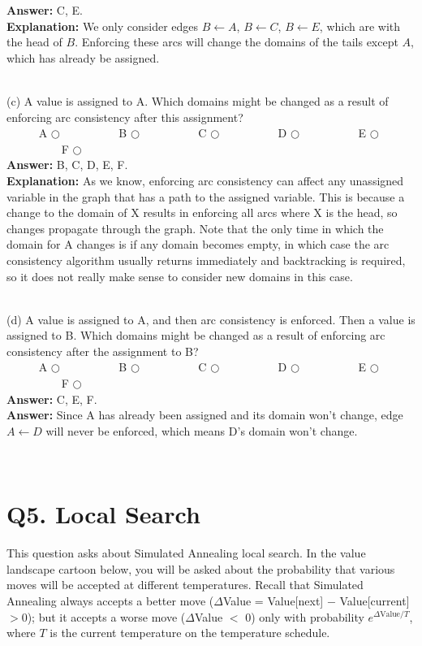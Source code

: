 \documentclass{article}
\begin{document}
\textbf{Answer:} C, E. \\

\textbf{Explanation:} We only consider edges $B \leftarrow A$, $B \leftarrow C$, $B \leftarrow E$, which are with the head of $B$. Enforcing these arcs will change the domains of the tails except $A$, which has already be assigned.

~\\

\noindent (c) A value is assigned to A. Which domains might be changed as a result of enforcing arc consistency after this assignment? \\
\indent ~~~~~ A $\bigcirc$ ~~~~~~~~~  B $\bigcirc$ ~~~~~~~~~  C $\bigcirc$ ~~~~~~~~~  D $\bigcirc$ ~~~~~~~~~  E $\bigcirc$~~~~~~~~~  F $\bigcirc$ \\

\textbf{Answer:} B, C, D, E, F. \\

\textbf{Explanation:} As we know, enforcing arc consistency can affect any unassigned variable in the graph that has a path to the assigned variable. This is because a change to the domain of X results in enforcing all arcs where X is the head, so changes propagate through the graph. Note that the only time in which the domain for A changes is if any domain becomes empty, in which case the arc consistency algorithm usually returns immediately and backtracking is required, so it does not really make sense to consider new domains in this case.

~\\

\noindent (d) A value is assigned to A, and then arc consistency is enforced. Then a value is assigned to B. Which domains might be changed as a result of enforcing arc consistency after the assignment to B? \\
\indent ~~~~~ A $\bigcirc$ ~~~~~~~~~  B $\bigcirc$ ~~~~~~~~~  C $\bigcirc$ ~~~~~~~~~  D $\bigcirc$ ~~~~~~~~~  E $\bigcirc$~~~~~~~~~  F $\bigcirc$ \\

\textbf{Answer:} C, E, F. \\

\textbf{Answer:} Since A has already been assigned and its domain won't change, edge $A \leftarrow D$ will never be enforced, which means D's domain won't change.

~\\

\newpage
\section{Q5. Local Search}
This question asks about Simulated Annealing local search. In the value landscape cartoon below, you will be asked about the probability that various moves will be accepted at different temperatures. Recall that Simulated Annealing always accepts a better move ($\Delta$Value = Value[next] $-$ Value[current]$>$0); but it accepts a worse move ($\Delta$Value $<$ 0) only with probability $e^{\Delta\text{Value}/T}$, where $T$ is the current temperature on the temperature schedule.
\end{document}
